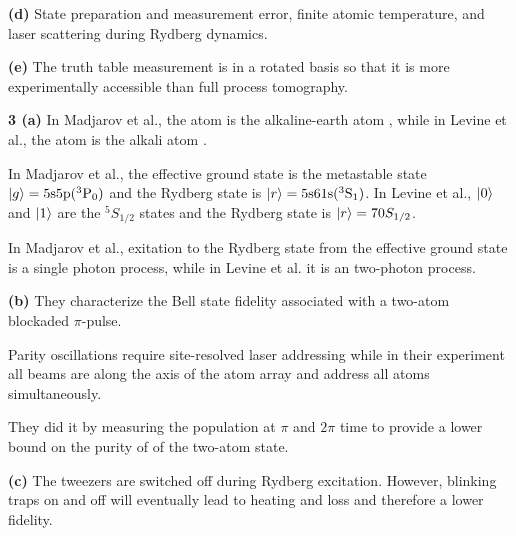 \documentclass{article}
\makeatletter
\newcommand*{\shifttext}[1]{%
  \settowidth{\@tempdima}{#1}%
  \hspace{-\@tempdima}#1%
}
\newcommand{\plabel}[1]{%
\shifttext{\textbf{#1}\quad}%
}
\newcommand{\prule}{%
\begin{center}%
\hdashrule[0.5ex]{.99\linewidth}{1pt}{1pt 2.5pt}%
\end{center}%
}
\makeatother
\begin{document}
\begin{center}
\end{center}

\plabel{(d)}%
State preparation and measurement error, finite atomic temperature, and laser scattering during Rydberg dynamics.

\plabel{(e)}%
The truth table measurement is in a rotated basis so that it is more experimentally accessible than full process tomography.

\prule

\plabel{3 (a)}%
In Madjarov et al., the atom is the alkaline-earth atom , while in Levine et al., the atom is the alkali atom .
\par
In Madjarov et al., the effective ground state is the metastable state $\ket{g} = \mathrm{5s5p({^3P_0})}$ and the Rydberg state is $\ket{r} = \mathrm{5s61s({^3S_1})}$. In Levine et al., $\ket{0}$ and $\ket{1}$ are the $^5S_{1/2}$ states and the Rydberg state is $\ket{r} = 70S_{1/2}$.
\par
In Madjarov et al., exitation to the Rydberg state from the effective ground state is a single photon process, while in  Levine et al. it is an two-photon process.

\plabel{(b)}%
They characterize the Bell state fidelity associated with a two-atom blockaded $\pi$-pulse.
\par
Parity oscillations require site-resolved laser addressing while in their experiment all beams are along the axis of the atom array and address all atoms simultaneously.
\par
They did it by measuring the population at $\pi$ and $2\pi$ time to provide a lower bound on the purity of of the two-atom state.

\plabel{(c)}%
The tweezers are switched off during Rydberg excitation.
However, blinking traps on and off will eventually lead to heating and loss and therefore a lower fidelity.

% 
% 
\end{document}
